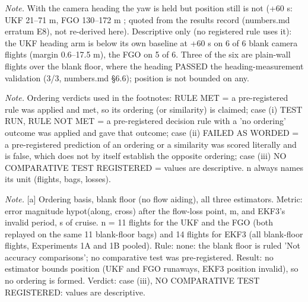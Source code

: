 \begin{table}[htbp]
\textit{Note.} With the camera heading the yaw is held but position still is not (+60 s: UKF 21--71 m, FGO 130--172 m \textdagger{}; quoted from the results record (numbers.md erratum E8), not re-derived here). Descriptive only (no registered rule uses it): the UKF heading arm is below its own baseline at +60 s on 6 of 6 blank camera flights (margin 0.6--17.5 m), the FGO on 5 of 6. Three of the six are plain-wall flights over the blank floor, where the heading PASSED the heading-measurement validation (3/3, numbers.md \S{}6.6); position is not bounded on any.\par
\textit{Note.} Ordering verdicts used in the footnotes: RULE MET = a pre-registered rule was applied and met, so its ordering (or similarity) is claimed; case (i) TEST RUN, RULE NOT MET = a pre-registered decision rule with a 'no ordering' outcome was applied and gave that outcome; case (ii) FAILED AS WORDED = a pre-registered prediction of an ordering or a similarity was scored literally and is false, which does not by itself establish the opposite ordering; case (iii) NO COMPARATIVE TEST REGISTERED = values are descriptive. n always names its unit (flights, bags, losses).\par
\textit{Note.} [a] Ordering basis, blank floor (no flow aiding), all three estimators. Metric: error magnitude hypot(along, cross) after the flow-loss point, m, and EKF3's invalid period, s of cruise. n = 11 flights for the UKF and the FGO (both replayed on the same 11 blank-floor bags) and 14 flights for EKF3 (all blank-floor flights, Experiments 1A and 1B pooled). Rule: none: the blank floor is ruled 'Not accuracy comparisons'; no comparative test was pre-registered. Result: no estimator bounds position (UKF and FGO runaways, EKF3 position invalid), so no ordering is formed. Verdict: case (iii), NO COMPARATIVE TEST REGISTERED: values are descriptive.\par
\end{table}
